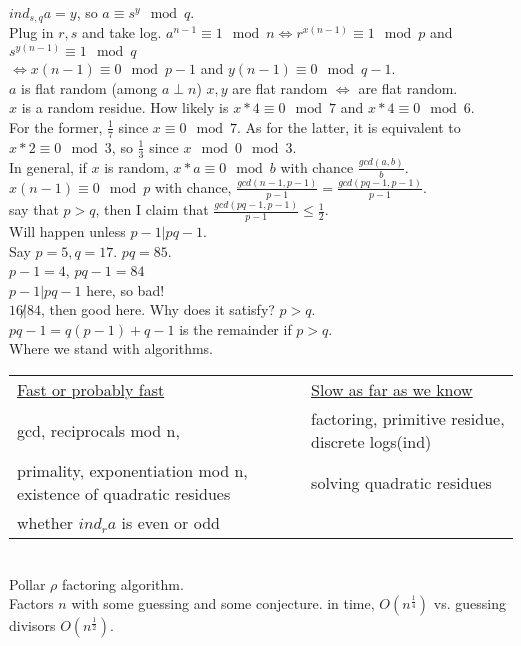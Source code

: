 \documentclass[13pt]{article}
\begin{document}
	$ind_{s,q}a = y$, so $a \equiv s^y \mod q$.\\
	Plug in $r,s$ and take log. $a^{n-1} \equiv 1 \mod n \Leftrightarrow
	r^{x(n -1)} \equiv 1 \mod p$ and $s^{y(n-1)} \equiv 1 \mod q$\\
	$\Leftrightarrow x(n-1) \equiv 0 \mod p-1$ and $y(n-1) \equiv 
	0 \mod q -1$.\\
	$a$ is flat random (among $a \perp n$) $x,y$ are flat random 
	$\Leftrightarrow$ are flat random.\\
	$x$ is a random residue. How likely is $x * 4 \equiv 0 \mod 7$ and
	$x * 4 \equiv 0 \mod 6.$\\
	For the former, $\frac{1}{7}$ since $x \equiv 0 \mod 7$. As for the 
	latter, it is equivalent to $x * 2 \equiv 0 \mod 3$, so $\frac{1}{3}$
	since $x \mod 0 \mod 3$.\\
	In general, if $x$ is random, $x*a \equiv 0 \mod b$ with chance
	$\frac{gcd(a,b)}{b}$.\\
	$x(n-1) \equiv 0 \mod p$ with chance, $\frac{gcd(n-1, p-1)}{p-1} = 
	\frac{gcd(pq-1, p-1)}{p-1}$.\\
	say that $p > q$, then I claim that $\frac{gcd(pq-1,p-1)}{p-1} \le 
	\frac{1}{2}$. \\
	Will happen unless $p-1 | pq - 1$.\\
	Say $p = 5, q= 17$. $pq= 85$.\\
	$p-1 = 4$, $pq-1 = 84$\\
	$p-1 | pq - 1$ here, so bad!\\
	$16 \not| 84$, then good here. Why does it satisfy? $p > q$.\\
	$pq - 1 = q(p-1) + q -1$ is the remainder if $p > q$.\\
	Where we stand with algorithms.\\ 
	\begin{tabular}{l l}
		\underline{Fast or probably fast}& \underline{Slow as far as we know}\\
		gcd, reciprocals mod n, & factoring, primitive residue, discrete logs(ind)\\
		primality, exponentiation mod n, existence of quadratic residues & solving quadratic residues\\
		whether $ind_r a$ is even or odd & \\
	\end{tabular}\\
	Pollar $\rho$ factoring algorithm.\\
	Factors $n$ with some guessing and some conjecture. in time,
	$O(n^{\frac{1}{4}})$ vs. guessing divisors $O(n^{\frac{1}{2}})$.
\end{document}
